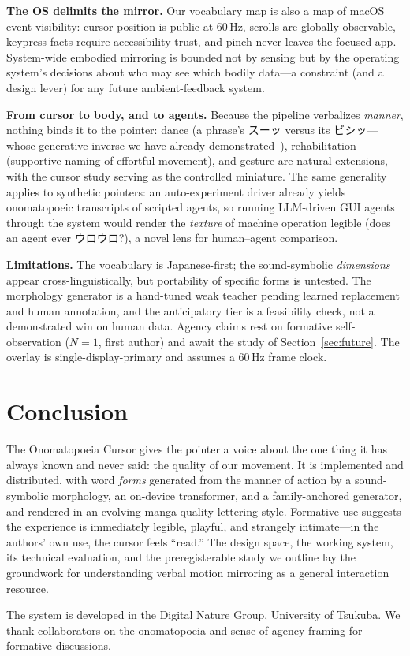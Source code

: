 \documentclass[sigconf,nonacm]{acmart}
\newcommand{\jp}[1]{#1}
\begin{document}
\textbf{The OS delimits the mirror.} Our vocabulary map is also a map of macOS event visibility: cursor position is public at 60\,Hz, scrolls are globally observable, keypress facts require accessibility trust, and pinch never leaves the focused app. System-wide embodied mirroring is bounded not by sensing but by the operating system's decisions about who may see which bodily data---a constraint (and a design lever) for any future ambient-feedback system.

\textbf{From cursor to body, and to agents.} Because the pipeline verbalizes \emph{manner}, nothing binds it to the pointer: dance (a phrase's \jp{スーッ} versus its \jp{ビシッ}---whose generative inverse we have already demonstrated~\cite{okamura2023dance}), rehabilitation (supportive naming of effortful movement), and gesture are natural extensions, with the cursor study serving as the controlled miniature. The same generality applies to synthetic pointers: an auto-experiment driver already yields onomatopoeic transcripts of scripted agents, so running LLM-driven GUI agents through the system would render the \emph{texture} of machine operation legible (does an agent ever \jp{ウロウロ}?), a novel lens for human--agent comparison.

\textbf{Limitations.} The vocabulary is Japanese-first; the sound-symbolic \emph{dimensions} appear cross-linguistically, but portability of specific forms is untested. The morphology generator is a hand-tuned weak teacher pending learned replacement and human annotation, and the anticipatory tier is a feasibility check, not a demonstrated win on human data. Agency claims rest on formative self-observation ($N{=}1$, first author) and await the study of Section~\ref{sec:future}. The overlay is single-display-primary and assumes a 60\,Hz frame clock.

\section{Conclusion}

The Onomatopoeia Cursor gives the pointer a voice about the one thing it has always known and never said: the quality of our movement. It is implemented and distributed, with word \emph{forms} generated from the manner of action by a sound-symbolic morphology, an on-device transformer, and a family-anchored generator, and rendered in an evolving manga-quality lettering style. Formative use suggests the experience is immediately legible, playful, and strangely intimate---in the authors' own use, the cursor feels ``read.'' The design space, the working system, its technical evaluation, and the preregisterable study we outline lay the groundwork for understanding verbal motion mirroring as a general interaction resource.

\begin{acks}
The system is developed in the Digital Nature Group, University of Tsukuba. We thank collaborators on the onomatopoeia and sense-of-agency framing for formative discussions.
\end{acks}



\end{document}
